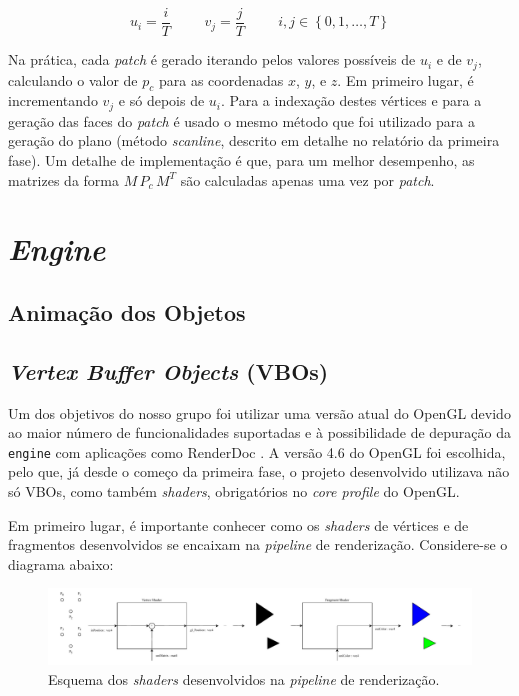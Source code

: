 \documentclass[12pt, a4paper]{article}
\begin{document}
$$
u_i = \frac{i}{T}
\hspace{1cm}
v_j = \frac{j}{T}
\hspace{1cm}
i, j \in \left \lbrace 0, 1, \ldots, T \right \rbrace
$$

Na prática, cada \emph{patch} é gerado iterando pelos valores possíveis de $u_i$ e de $v_j$,
calculando o valor de $p_c$ para as coordenadas $x$, $y$, e $z$. Em primeiro lugar, é incrementando
$v_j$ e só depois de $u_i$. Para a indexação destes vértices e para a geração das faces do
\emph{patch} é usado o mesmo método que foi utilizado para a geração do plano (método
\emph{scanline}, descrito em detalhe no relatório da primeira fase). Um detalhe de implementação é
que, para um melhor desempenho, as matrizes da forma $M \, P_c \, M^T$ são calculadas apenas uma vez
por \emph{patch}.

\section{\emph{Engine}}

\subsection{Animação dos Objetos}

\subsection{\emph{Vertex Buffer Objects} (VBOs)}

Um dos objetivos do nosso grupo foi utilizar uma versão atual do OpenGL devido ao maior número de
funcionalidades suportadas e à possibilidade de depuração da \texttt{engine} com aplicações como
RenderDoc \cite{renderdoc}. A versão 4.6 do OpenGL foi escolhida, pelo que, já desde o começo da
primeira fase, o projeto desenvolvido utilizava não só VBOs, como também \emph{shaders},
obrigatórios no \emph{core profile} do OpenGL.

Em primeiro lugar, é importante conhecer como os \emph{shaders} de vértices e de fragmentos
desenvolvidos se encaixam na \emph{pipeline} de renderização. Considere-se o diagrama abaixo:

\begin{figure}[H]
    \centering
    \includegraphics[width=\textwidth]{res/phase3/Shaders.pdf}
    \caption{Esquema dos \emph{shaders} desenvolvidos na \emph{pipeline} de renderização.}
\end{figure}
\end{document}

